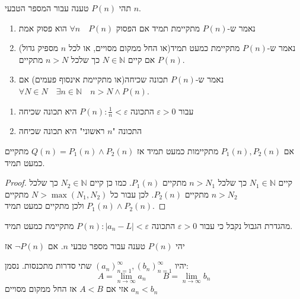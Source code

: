 \documentclass{tstextbook}
\begin{document}
\begin{definition}
תהי \(P(n)\) טענה עבור המספר הטבעי \(n\). 

  \begin{enumerate}
    \item נאמר ש-\(P(n)\) מתקיימת תמיד אם הפסוק \(\forall n\quad P(n)\) הוא פסוק אמת 


    \item נאמר ש-\(P(n)\) מתקיימת כמעט תמיד(או החל ממקום מסויים, או לכל \(n\) מספיק גדול) אם קיים \(N \in \mathbb{N}\) כך שלכל \(n>N\) מתקיים \(P(n)\). 


    \item נאמר ש-\(P(n)\) תכונה שכיחה(או מתקיימת אינסוף פעמים) אם \(\forall N\in N \quad\exists n \in \mathbb{N}\quad n>N\land P(n)\). 


  \end{enumerate}
\end{definition}
\begin{example}
  \begin{enumerate}
    \item עבור \(\varepsilon>0\) התכונה \(P(n): \frac{1}{n}<\varepsilon\) היא תכונה שכיחה 


    \item התכונה "\(n\) ראשוני" היא תכונה שכיחה 


  \end{enumerate}
\end{example}
\begin{proposition}
אם \(P_{1}(n),P_{2}(n)\) מתקיימות כמעט תמיד אז \(Q(n)=P_{1}(n)\land P_{2}(n)\) מתקיים כמעט תמיד.

\end{proposition}
\begin{proof}
קיים \(N_{1} \in \mathbb{N}\) כך שלכל \(n>N_{1}\) מתקיים \(P_{1}(n)\). כמו כן קיים \(N_{2} \in \mathbb{N}\) כך שלכל \(n>N_{2}\) מתקיים \(P_{2}(n)\). לכן עבור כל \(N>\max(N_{1},N_{2})\) מתקיים \(P_{1}(n)\land P_{2}(n)\) ולכן מתקיים כמעט תמיד.

\end{proof}
\begin{remark}
מהגדרת הגבול נקבל כי עבור \(\varepsilon>0\) התכונה \(P(n):|a_{n}-L|<\varepsilon\) מתקיימת כמעט תמיד.

\end{remark}
\begin{proposition}
יהי \(P(n)\) טענה עבור מספר טבעי \(n\). אם \(\lnot P(n)\) אז 

\end{proposition}
\begin{theorem}
יהיו \((a_n)_{n=1}^\infty,(b_{n})_{n=1}^\infty\) שתי סדרות מתכנסות. נסמן:
$$A=\lim_{ n \to \infty } a_{n}\qquad B=\lim_{ n \to \infty } b_{n}$$
אזי אם \(A<B\) אז החל ממקום מסויים \(a_{n}<b_{n}\)

\end{theorem}
\end{document}
